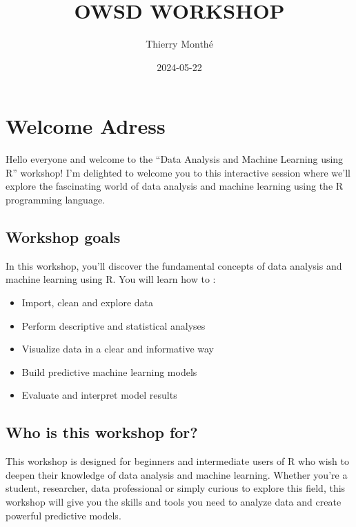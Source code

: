 \documentclass[
]{book}
\title{OWSD WORKSHOP}
\author{Thierry Monthé}
\date{2024-05-22}
\providecommand{\tightlist}{%
  \setlength{\itemsep}{0pt}\setlength{\parskip}{0pt}}
\begin{document}
\maketitle

{
\setcounter{tocdepth}{1}
\tableofcontents
}
\hypertarget{welcome-adress}{%
\chapter{Welcome Adress}\label{welcome-adress}}

Hello everyone and welcome to the ``Data Analysis and Machine Learning using R'' workshop! I'm delighted to welcome you to this interactive session where we'll explore the fascinating world of data analysis and machine learning using the R programming language.

\hypertarget{workshop-goals}{%
\section*{Workshop goals}\label{workshop-goals}}

In this workshop, you'll discover the fundamental concepts of data analysis and machine learning using R. You will learn how to :

\begin{itemize}
\tightlist
\item
  Import, clean and explore data
\item
  Perform descriptive and statistical analyses
\item
  Visualize data in a clear and informative way
\item
  Build predictive machine learning models
\item
  Evaluate and interpret model results
\end{itemize}

\hypertarget{who-is-this-workshop-for}{%
\section*{Who is this workshop for?}\label{who-is-this-workshop-for}}

This workshop is designed for beginners and intermediate users of R who wish to deepen their knowledge of data analysis and machine learning. Whether you're a student, researcher, data professional or simply curious to explore this field, this workshop will give you the skills and tools you need to analyze data and create powerful predictive models.
\end{document}

